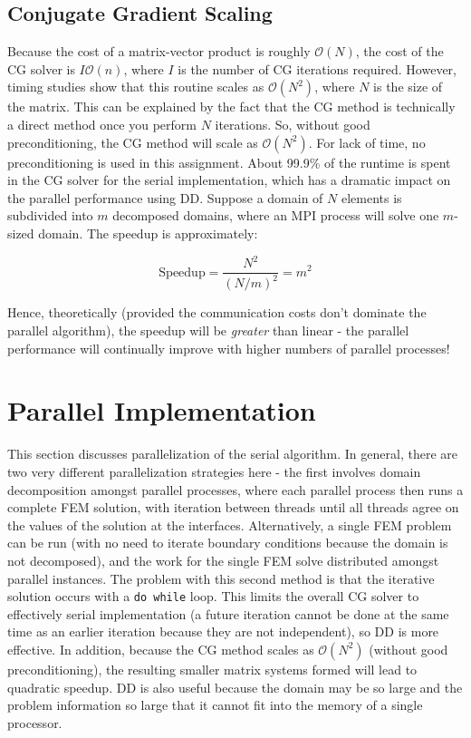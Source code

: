 \documentclass[10pt]{article}
\newcommand{\beq}{\begin{equation}}
\newcommand{\eeq}{\end{equation}}
\begin{document}
\subsection{Conjugate Gradient Scaling}
Because the cost of a matrix-vector product is roughly \(\mathscr{O}(N)\), the cost of the CG solver is \(I\mathscr{O}(n)\), where \(I\) is the number of CG iterations required. However, timing studies show that this routine scales as \(\mathscr{O}(N^2)\), where \(N\) is the size of the matrix. This can be explained by the fact that the CG method is technically a direct method once you perform \(N\) iterations. So, without good preconditioning, the CG method will scale as \(\mathscr{O}(N^2)\). For lack of time, no preconditioning is used in this assignment. About 99.9\% of the runtime is spent in the CG solver for the serial implementation, which has a dramatic impact on the parallel performance using DD. Suppose a domain of \(N\) elements is subdivided into \(m\) decomposed domains, where an MPI process will solve one \(m\)-sized domain. The speedup is approximately:

\beq
\textrm{Speedup}=\frac{N^2}{(N/m)^2}=m^2
\eeq

Hence, theoretically (provided the communication costs don't dominate the parallel algorithm), the speedup will be {\it greater} than linear - the parallel performance will continually improve with higher numbers of parallel processes! 






\section{Parallel Implementation}
This section discusses parallelization of the serial algorithm. In general, there are two very different parallelization strategies here - the first involves domain decomposition amongst parallel processes, where each parallel process then runs a complete FEM solution, with iteration between threads until all threads agree on the values of the solution at the interfaces. Alternatively, a single FEM problem can be run (with no need to iterate boundary conditions because the domain is not decomposed), and the work for the single FEM solve distributed amongst parallel instances. The problem with this second method is that the iterative solution occurs with a {\tt do while} loop. This limits the overall CG solver to effectively serial implementation (a future iteration cannot be done at the same time as an earlier iteration because they are not independent), so DD is more effective. In addition, because the CG method scales as \(\mathscr{O}(N^2)\) (without good preconditioning), the resulting smaller matrix systems formed will lead to quadratic speedup. DD is also useful because the domain may be so large and the problem information so large that it cannot fit into the memory of a single processor. 
\end{document}
